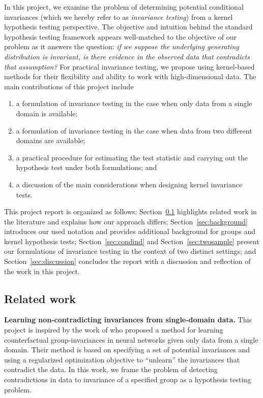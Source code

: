 In this project, we examine the problem of determining potential conditional invariances (which we hereby refer to as \textit{invariance testing}) from a kernel hypothesis testing perspective. The objective and intuition behind the standard hypothesis testing framework appears well-matched to the objective of our problem as it answers the question: \textit{if we suppose the underlying generating distribution is invariant, is there evidence in the observed data that contradicts that assumption?} For practical invariance testing, we propose using kernel-based methods for their flexibility and ability to work with high-dimensional data. The main contributions of this project include
\begin{enumerate}

\item
a formulation of invariance testing in the case when only data from a single domain is available;

\item
a formulation of invariance testing in the case when data from two different domains are available;

\item
a practical procedure for estimating the test statistic and carrying out the hypothesis test under both formulations; and

\item
a discussion of the main considerations when designing kernel invariance tests.

\end{enumerate}

This project report is organized as follows: Section~\ref{sec:related} highlights related work in the literature and explains how our approach differs; Section~\ref{sec:background} introduces our used notation and provides additional background for groups and kernel hypothesis tests; Section~\ref{sec:condind} and Section~\ref{sec:twosample} present our formulations of invariance testing in the context of two distinct settings; and Section~\ref{sec:discussion} concludes the report with a discussion and reflection of the work in this project.


\subsection{Related work}\label{sec:related}

\textbf{Learning non-contradicting invariances from single-domain data.} This project is inspired by the work of \textcite{Mouli:2021} who proposed a method for learning counterfactual group-invariances in neural networks given only data from a single domain. Their method is based on specifying a set of potential invariances and using a regularized optimization objective to ``unlearn'' the invariances that contradict the data. In this work, we frame the problem of detecting contradictions in data to invariance of a specified group as a hypothesis testing problem.
\\

